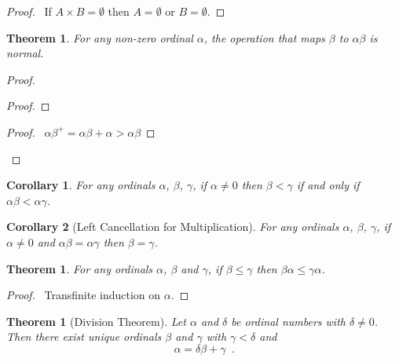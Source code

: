 \documentclass{book}
\let\qed\relax
\newtheorem{cor}{Corollary}[ax]
\newtheorem{thm}[ax]{Theorem}
\theoremstyle{definition}
\begin{document}
\begin{proof}
\pf\ If $A \times B = \emptyset$ then $A = \emptyset$ or $B = \emptyset$. \qed
\end{proof}

\begin{thm}
\label{thm:multnormal}
For any non-zero ordinal $\alpha$, the operation that maps $\beta$ to $\alpha \beta$ is normal.
\end{thm}

\begin{proof}
\pf
{}
\begin{proof}
\end{proof}
\begin{proof}
	\pf\ $\alpha \beta^+ = \alpha \beta + \alpha > \alpha \beta$
\end{proof}
\qed
\end{proof}

\begin{cor}
For any ordinals $\alpha$, $\beta$, $\gamma$, if $\alpha \neq 0$ then $\beta < \gamma$ if and only if $\alpha \beta < \alpha \gamma$.
\end{cor}

\begin{cor}[Left Cancellation for Multiplication]
For any ordinals $\alpha$, $\beta$, $\gamma$, if $\alpha \neq 0$ and $\alpha \beta = \alpha \gamma$ then $\beta = \gamma$.
\end{cor}

\begin{thm}
For any ordinals $\alpha$, $\beta$ and $\gamma$, if $\beta \leq \gamma$ then $\beta \alpha \leq \gamma \alpha$.
\end{thm}

\begin{proof}
\pf\ Transfinite induction on $\alpha$. \qed
\end{proof}

\begin{thm}[Division Theorem]
Let $\alpha$ and $\delta$ be ordinal numbers with $\delta \neq 0$. Then there exist unique ordinals $\beta$ and $\gamma$ with $\gamma < \delta$ and
\[ \alpha = \delta \beta + \gamma \enspace . \]
\end{thm}
\end{document}
